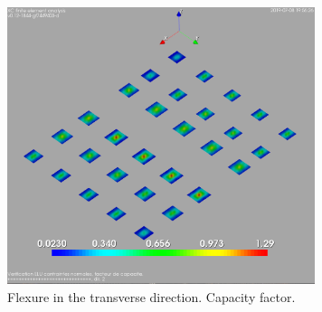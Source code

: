 \begin{figure}
  \begin{center}
    \includegraphics[width=90mm]{figures/flexure_design_cf_transv_direction}
  \end{center}
    \caption{Flexure in the transverse direction. Capacity factor.}\label{fg_flexure_design_cf_transv_direction}
\end{figure}

